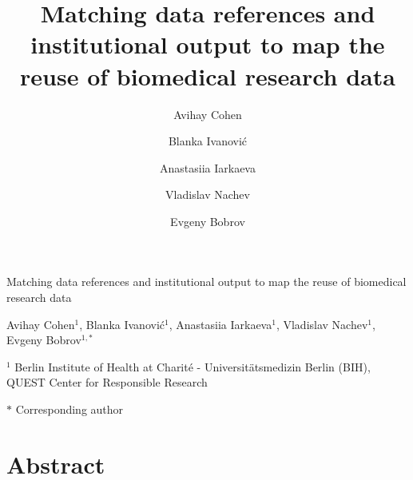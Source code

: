\documentclass[
  letterpaper,
  DIV=11,
  numbers=noendperiod]{scrartcl}
\title{Matching data references and institutional output to map the
reuse of biomedical research data}
\author{Avihay Cohen \and Blanka Ivanović \and Anastasiia
Iarkaeva \and Vladislav Nachev \and Evgeny Bobrov}
\date{}
\renewcommand{\maketitle}{}
\begin{document}
\maketitle


\begin{center}
{\LARGE Matching data references and institutional output to map the reuse of biomedical research data\par}
\vspace{0.8em}
Avihay Cohen$^{1}$, Blanka Ivanović$^{1}$, Anastasiia Iarkaeva$^{1}$, Vladislav Nachev$^{1}$, Evgeny Bobrov$^{1,\ast}$\par
\vspace{0.4em}
{\small $^{1}$ Berlin Institute of Health at Charité - Universitätsmedizin Berlin (BIH), QUEST Center for Responsible Research\par}
\vspace{0.2em}
{\small $\ast$ Corresponding author\par}
\end{center}
\vspace{1em}

\section*{Abstract}\label{abstract}
\end{document}
